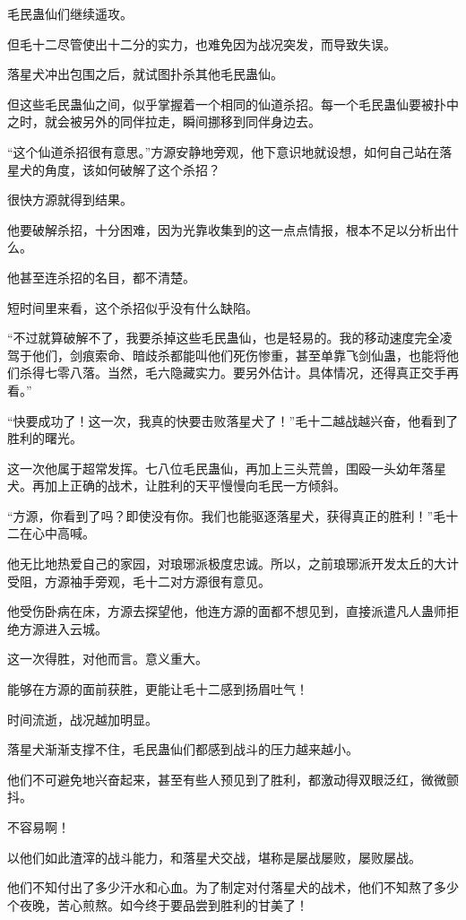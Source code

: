 \begin{this_body}
毛民蛊仙们继续遥攻。

但毛十二尽管使出十二分的实力，也难免因为战况突发，而导致失误。

落星犬冲出包围之后，就试图扑杀其他毛民蛊仙。

但这些毛民蛊仙之间，似乎掌握着一个相同的仙道杀招。每一个毛民蛊仙要被扑中之时，就会被另外的同伴拉走，瞬间挪移到同伴身边去。

“这个仙道杀招很有意思。”方源安静地旁观，他下意识地就设想，如何自己站在落星犬的角度，该如何破解了这个杀招？

很快方源就得到结果。

他要破解杀招，十分困难，因为光靠收集到的这一点点情报，根本不足以分析出什么。

他甚至连杀招的名目，都不清楚。

短时间里来看，这个杀招似乎没有什么缺陷。

“不过就算破解不了，我要杀掉这些毛民蛊仙，也是轻易的。我的移动速度完全凌驾于他们，剑痕索命、暗歧杀都能叫他们死伤惨重，甚至单靠飞剑仙蛊，也能将他们杀得七零八落。当然，毛六隐藏实力。要另外估计。具体情况，还得真正交手再看。”

“快要成功了！这一次，我真的快要击败落星犬了！”毛十二越战越兴奋，他看到了胜利的曙光。

这一次他属于超常发挥。七八位毛民蛊仙，再加上三头荒兽，围殴一头幼年落星犬。再加上正确的战术，让胜利的天平慢慢向毛民一方倾斜。

“方源，你看到了吗？即使没有你。我们也能驱逐落星犬，获得真正的胜利！”毛十二在心中高喊。

他无比地热爱自己的家园，对琅琊派极度忠诚。所以，之前琅琊派开发太丘的大计受阻，方源袖手旁观，毛十二对方源很有意见。

他受伤卧病在床，方源去探望他，他连方源的面都不想见到，直接派遣凡人蛊师拒绝方源进入云城。

这一次得胜，对他而言。意义重大。

能够在方源的面前获胜，更能让毛十二感到扬眉吐气！

时间流逝，战况越加明显。

落星犬渐渐支撑不住，毛民蛊仙们都感到战斗的压力越来越小。

他们不可避免地兴奋起来，甚至有些人预见到了胜利，都激动得双眼泛红，微微颤抖。

不容易啊！

以他们如此渣滓的战斗能力，和落星犬交战，堪称是屡战屡败，屡败屡战。

他们不知付出了多少汗水和心血。为了制定对付落星犬的战术，他们不知熬了多少个夜晚，苦心煎熬。如今终于要品尝到胜利的甘美了！


\end{this_body}
